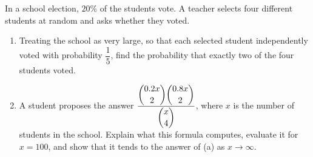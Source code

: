 In a school election, $20\%$ of the students vote. A teacher selects four different students at random and asks whether they voted.
\begin{enumerate}
\item[(a)] Treating the school as very large, so that each selected student independently voted with probability $\dfrac15$, find the probability that exactly two of the four students voted.
\item[(b)] A student proposes the answer $\dfrac{\dbinom{0.2x}{2}\dbinom{0.8x}{2}}{\dbinom x4}$, where $x$ is the number of students in the school. Explain what this formula computes, evaluate it for $x=100$, and show that it tends to the answer of (a) as $x\to\infty$.
\end{enumerate}
